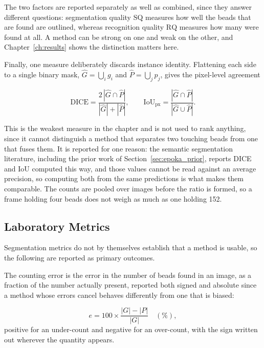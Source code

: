 %
The two factors are reported separately as well as combined, since they answer
different questions: segmentation quality $\mathrm{SQ}$ measures how well the
beads that are found are outlined, whereas recognition quality $\mathrm{RQ}$
measures how many were found at all. A method can be strong on one and weak on the
other, and Chapter~\ref{ch:results} shows the distinction matters here.

Finally, one measure deliberately discards instance identity. Flattening each side
to a single binary mask, $\hat{G} = \bigcup_i g_i$ and $\hat{P} = \bigcup_j p_j$,
gives the pixel-level agreement
%

\begin{equation}
    \mathrm{DICE} = \frac{2\,|\hat{G} \cap \hat{P}|}{|\hat{G}| + |\hat{P}|},
    \qquad
    \mathrm{IoU}_{\text{px}} = \frac{|\hat{G} \cap \hat{P}|}
                                    {|\hat{G} \cup \hat{P}|}.
    \label{eq:pixel_dice}
\end{equation}

%
This is the weakest measure in the chapter and is not used to rank anything, since
it cannot distinguish a method that separates two touching beads from one that
fuses them. It is reported for one reason: the semantic segmentation literature,
including the prior work of Section~\ref{sec:epoka_prior}, reports DICE and IoU
computed this way, and those values cannot be read against an average precision,
so computing both from the same predictions is what makes them comparable. The
counts are pooled over images before the ratio is formed, so a frame holding
four beads does not weigh as much as one holding 152.

\subsection{Laboratory Metrics}

Segmentation metrics do not by themselves establish that a method is usable, so
the following are reported as primary outcomes.

The counting error is the error in the number of beads found in an image,
as a fraction of the number actually present, reported both signed and absolute
since a method whose errors cancel behaves differently from one that is biased:
%

\begin{equation}
    e = 100 \times \frac{|G| - |P|}{|G|} \quad (\%),
    \label{eq:counting_error}
\end{equation}
%
positive for an under-count and negative for an over-count, with the sign written
out wherever the quantity appears.

